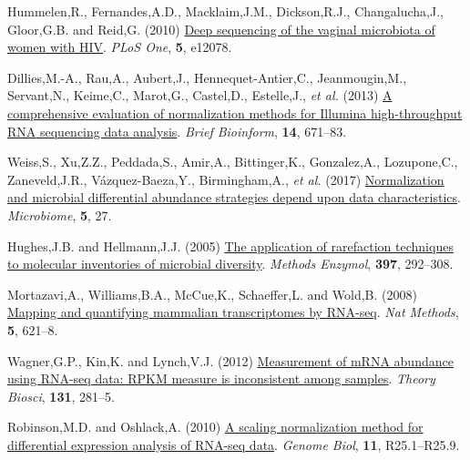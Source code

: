 \documentclass[
]{article}
\newlength{\cslhangindent}
\newenvironment{CSLReferences}[2] %
 {\begin{list}{}{%
  \setlength{\itemindent}{0pt}
  \setlength{\leftmargin}{0pt}
  \setlength{\parsep}{0pt}
  \ifodd #1
   \setlength{\leftmargin}{\cslhangindent}
   \setlength{\itemindent}{-1\cslhangindent}
  \fi
  \setlength{\itemsep}{#2\baselineskip}}}
 {\end{list}}
\providecommand{\DIFadd}[1]{{\protect\color{blue}\uwave{#1}}} %
\providecommand{\DIFaddbegin}{} %
\providecommand{\DIFaddend}{} %
\newcommand{\DIFaddincludegraphics}[2][]{{\color{blue}\fbox{\DIFOincludegraphics[#1]{#2}}}} %
\DeclareRobustCommand{\DIFaddbegin}{\DIFOaddbegin \let\includegraphics\DIFaddincludegraphics} %
\DeclareRobustCommand{\DIFaddend}{\DIFOaddend \let\includegraphics\DIFOincludegraphics} %
\begin{document}
\begin{CSLReferences}{1}{1}
 \DIFaddbegin \DIFadd{30. }\DIFaddend Hummelen,R., Fernandes,A.D., Macklaim,J.M., Dickson,R.J.,
Changalucha,J., Gloor,G.B. and Reid,G. (2010)
\href{https://doi.org/10.1371/journal.pone.0012078}{Deep sequencing of
the vaginal microbiota of women with {HIV}}. \emph{PLoS One},
\textbf{5}, e12078.

 \DIFaddbegin \DIFadd{31. }\DIFaddend Dillies,M.-A., Rau,A., Aubert,J., Hennequet-Antier,C.,
Jeanmougin,M., Servant,N., Keime,C., Marot,G., Castel,D., Estelle,J.,
\emph{et al.} (2013) \href{https://doi.org/10.1093/bib/bbs046}{A
comprehensive evaluation of normalization methods for {Illumina}
high-throughput {RNA} sequencing data analysis}. \emph{Brief Bioinform},
\textbf{14}, 671--83.

 \DIFaddbegin \DIFadd{32. }\DIFaddend Weiss,S., Xu,Z.Z., Peddada,S., Amir,A., Bittinger,K., Gonzalez,A.,
Lozupone,C., Zaneveld,J.R., Vázquez-Baeza,Y., Birmingham,A., \emph{et
al.} (2017)
\href{https://doi.org/10.1186/s40168-017-0237-y}{Normalization and
microbial differential abundance strategies depend upon data
characteristics}. \emph{Microbiome}, \textbf{5}, 27.

 \DIFaddbegin \DIFadd{33. }\DIFaddend Hughes,J.B. and Hellmann,J.J. (2005)
\href{https://doi.org/10.1016/S0076-6879(05)97017-1}{The application of
rarefaction techniques to molecular inventories of microbial diversity}.
\emph{Methods Enzymol}, \textbf{397}, 292--308.

 \DIFaddbegin \DIFadd{34. }\DIFaddend Mortazavi,A., Williams,B.A., McCue,K., Schaeffer,L. and Wold,B.
(2008) \href{https://doi.org/10.1038/nmeth.1226}{Mapping and quantifying
mammalian transcriptomes by {RNA-seq}}. \emph{Nat Methods}, \textbf{5},
621--8.

 \DIFaddbegin \DIFadd{35. }\DIFaddend Wagner,G.P., Kin,K. and Lynch,V.J. (2012)
\href{https://doi.org/10.1007/s12064-012-0162-3}{Measurement of mRNA
abundance using RNA-seq data: RPKM measure is inconsistent among
samples}. \emph{Theory Biosci}, \textbf{131}, 281--5.

 \DIFaddbegin \DIFadd{36. }\DIFaddend Robinson,M.D. and Oshlack,A. (2010)
\href{https://doi.org/10.1186/gb-2010-11-3-r25}{A scaling normalization
method for differential expression analysis of {RNA-seq} data}.
\emph{Genome Biol}, \textbf{11}, R25.1--R25.9.


\end{CSLReferences}
\end{document}
